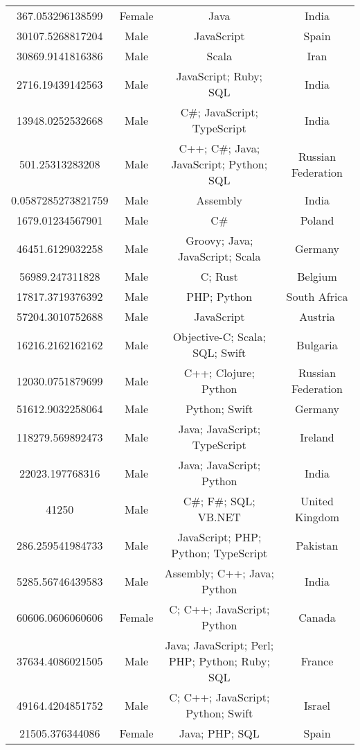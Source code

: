\begin{center}
\begin{tabular}{ |c|c|c|c| }
367.053296138599  &  Female  &  Java  &  India  \\ 
30107.5268817204  &  Male  &  JavaScript  &  Spain  \\ 
30869.9141816386  &  Male  &  Scala  &  Iran  \\ 
2716.19439142563  &  Male  &  JavaScript; Ruby; SQL  &  India  \\ 
13948.0252532668  &  Male  &  C\#; JavaScript; TypeScript  &  India  \\ 
501.25313283208  &  Male  &  C++; C\#; Java; JavaScript; Python; SQL  &  Russian Federation  \\ 
0.0587285273821759  &  Male  &  Assembly  &  India  \\ 
1679.01234567901  &  Male  &  C\#  &  Poland  \\ 
46451.6129032258  &  Male  &  Groovy; Java; JavaScript; Scala  &  Germany  \\ 
56989.247311828  &  Male  &  C; Rust  &  Belgium  \\ 
17817.3719376392  &  Male  &  PHP; Python  &  South Africa  \\ 
57204.3010752688  &  Male  &  JavaScript  &  Austria  \\ 
16216.2162162162  &  Male  &  Objective-C; Scala; SQL; Swift  &  Bulgaria  \\ 
12030.0751879699  &  Male  &  C++; Clojure; Python  &  Russian Federation  \\ 
51612.9032258064  &  Male  &  Python; Swift  &  Germany  \\ 
118279.569892473  &  Male  &  Java; JavaScript; TypeScript  &  Ireland  \\ 
22023.197768316  &  Male  &  Java; JavaScript; Python  &  India  \\ 
41250  &  Male  &  C\#; F\#; SQL; VB.NET  &  United Kingdom  \\ 
286.259541984733  &  Male  &  JavaScript; PHP; Python; TypeScript  &  Pakistan  \\ 
5285.56746439583  &  Male  &  Assembly; C++; Java; Python  &  India  \\ 
60606.0606060606  &  Female  &  C; C++; JavaScript; Python  &  Canada  \\ 
37634.4086021505  &  Male  &  Java; JavaScript; Perl; PHP; Python; Ruby; SQL  &  France  \\ 
49164.4204851752  &  Male  &  C; C++; JavaScript; Python; Swift  &  Israel  \\ 
21505.376344086  &  Female  &  Java; PHP; SQL  &  Spain  \\ 

\end{tabular}
\end{center}
